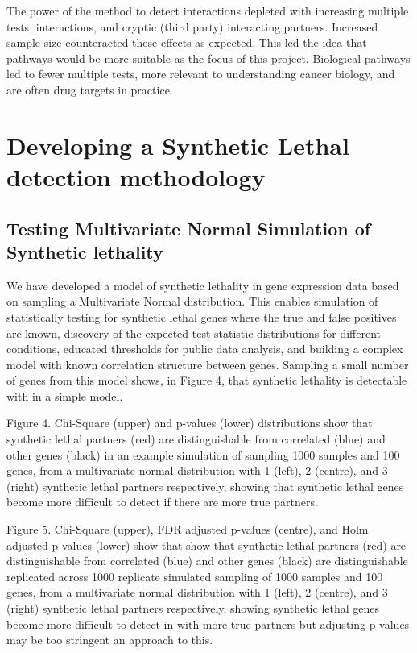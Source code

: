 The power of the method to detect interactions depleted with increasing multiple tests, interactions, and cryptic (third party) interacting partners. Increased sample size counteracted these effects as expected. This led the idea that pathways would be more suitable as the focus of this project. Biological pathways led to fewer multiple tests, more relevant to understanding cancer biology, and are often drug targets in practice.

\section{Developing a Synthetic Lethal detection methodology}

\subsection{Testing Multivariate Normal Simulation of Synthetic lethality}

We have developed a model of synthetic lethality in gene expression data based on sampling a Multivariate Normal distribution.  This enables simulation of statistically testing for synthetic lethal genes where the true and false positives are known, discovery of the expected test statistic distributions for different conditions, educated thresholds for public data analysis, and building a complex model with known correlation structure between genes.  Sampling a small number of genes from this model shows, in Figure 4, that synthetic lethality is detectable with in a simple model.

Figure 4.  Chi-Square (upper) and p-values (lower) distributions show that synthetic lethal partners (red) are distinguishable from correlated (blue) and other genes (black) in an example simulation of sampling 1000 samples and 100 genes, from a multivariate normal distribution with 1 (left), 2 (centre), and 3 (right) synthetic lethal partners respectively, showing that synthetic lethal genes become more difficult to detect if there are more true partners.

Figure 5.  Chi-Square (upper), FDR adjusted p-values (centre), and Holm adjusted p-values (lower) show that show that synthetic lethal partners (red) are distinguishable from correlated (blue) and other genes (black) are distinguishable replicated across 1000 replicate simulated sampling of 1000 samples and 100 genes, from a multivariate normal distribution with 1 (left), 2 (centre), and 3 (right) synthetic lethal partners respectively, showing synthetic lethal genes become more difficult to detect in with more true partners but adjusting p-values may be too stringent an approach to this.

